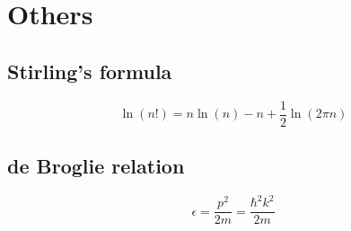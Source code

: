 \section{Others}

\subsection*{Stirling's formula}

\begin{equation*}
    \ln (n!) = n  \ln (n) - n + \frac{1}{2} \ln (2 \pi n)
\end{equation*}

\subsection*{de Broglie relation}

\begin{equation*}
    \epsilon = \frac{p^2}{2m} = \frac{\hbar^2 k^2}{2m}
\end{equation*}